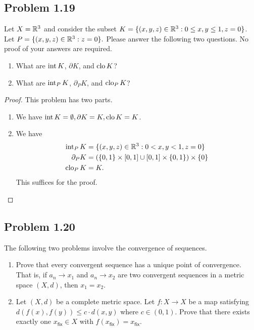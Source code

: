 \documentclass[12pt]{article}
\begin{document}
\newpage 

\subsection{Problem 1.19}

\begin{problem}
	Let $X = \mathbb{R}^3$ and consider the subset $K = \{(x, y, z) \in \mathbb{R}^3 : 0 \leq x, y \leq 1, z = 0 \}$. Let $P = \{(x, y, z) \in \mathbb{R}^3 : z = 0\}.$ Please answer the following two questions. No proof of your answers are required. 
        \begin{enumerate}[label = (\alph*)]
            \item What are $\operatorname{int} K$, $\partial K$, and $\operatorname{clo} K$?
            \item What are $\operatorname{int}_P K$, $\partial_P K$, and $\operatorname{clo}_P K$?
        \end{enumerate}
\end{problem}
\begin{proof}
	This problem has two parts. 
	\begin{enumerate}[label = (\alph*)]
		\item We have $\operatorname{int} K = \emptyset, \partial K = K, \operatorname{clo} K = K$. 
		\item We have 
		\begin{align*}
			\operatorname{int}_P K & = \{(x, y, z) \in \mathbb{R}^3 : 0 < x, y < 1, z = 0\} \\
			\partial_P K & = (\{0, 1\} \times [0, 1] \cup [0, 1] \times \{0, 1\}) \times \{0\} \\
			\operatorname{clo}_P K & = K. 
		\end{align*}
		This suffices for the proof. 
	\end{enumerate}
\end{proof}
\newpage 

\subsection{Problem 1.20}

\begin{problem} \label{problem-1.20}
	The following two problems involve the convergence of sequences. 
        \begin{enumerate}[label = (\alph*)]
            \item Prove that every convergent sequence has a unique point of convergence. That is, if $a_n \to x_1$ and $a_n \to x_2$ are two convergent sequences in a metric space $(X, d)$, then $x_1 = x_2$.
            \item Let $(X, d)$ be a complete metric space. Let $f : X \to X$ be a map satisfying $d(f(x), f(y)) \leq c \cdot d(x, y)$ where $c \in (0, 1)$. Prove that there exists exactly one $x_{\mathsf{fix}} \in X$ with $f(x_{\mathsf{fix}}) = x_{\mathsf{fix}}$. 
        \end{enumerate}
\end{problem}
\end{document}
